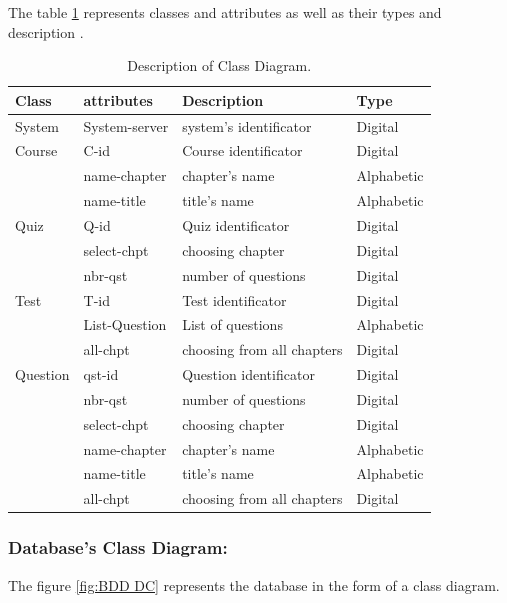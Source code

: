 \newpage
The table \ref{tab:DC} represents classes and attributes as well as their types and description .

\begin{table}[h!]
	\begin{center}
		\begin{tabular}{ |p{3cm}|p{3cm}|p{4cm}|p{2cm}|  }
 		\hline
 		Class & attributes & Description & Type \\
 		\hline \hline
 		System & System-server & system's identificator & Digital \\
 		\hline
 		Course & C-id & Course identificator & Digital  \\
			& name-chapter & chapter's name & Alphabetic \\
			& name-title & title's name & Alphabetic \\
		\hline
		Quiz & Q-id & Quiz identificator & Digital  \\
			& select-chpt & choosing chapter & Digital \\
			& nbr-qst & number of questions & Digital \\
		\hline
		Test & T-id & Test identificator & Digital  \\
			& List-Question & List of questions & Alphabetic \\
			& all-chpt & choosing from all chapters & Digital \\
		\hline
		Question & qst-id & Question identificator & Digital  \\
			& nbr-qst & number of questions & Digital \\
			& select-chpt & choosing chapter & Digital \\
			& name-chapter & chapter's name & Alphabetic \\
			& name-title & title's name & Alphabetic \\
			& all-chpt & choosing from all chapters & Digital \\
		\hline
\end{tabular}
\end{center}
\caption{Description of Class Diagram.}
\label{tab:DC}
\end{table}


\newpage

\subsubsection{Database's Class Diagram:}

The figure \ref{fig:BDD DC} represents the database in the form of a class diagram.\\\\\\

